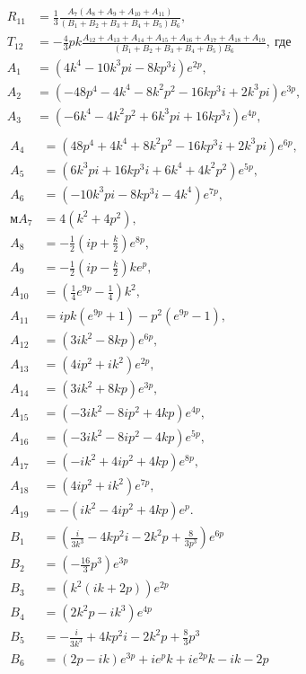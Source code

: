 \documentclass[a4 paper, 12 pt]{extarticle}
\begin{document}
   \[
   \begin{aligned}
   R_{11} &= \frac{1}{3}{\frac { A_7  \left( A_8+A_9+ A_{10}+A_{11}  \right) }{ \left( 
   		B_1+B_2+B_3+ B_4+B_5 \right) B_6 }}, \\
   T_{12} &= -\frac{4}{3}pk{\frac {A_{12} + A_{13} + A_{14} + A_{15} + A_{16} + A_{17} + A_{18} + A_{19}}{ \left(B_1+B_2+B_3+ B_4+B_5 \right) B_6 }}, \ \text{где}\\
   A_1 &= \left(4k^4 -10k^3pi - 8kp^3i\right)e^{2p}, \\
   A_2 &= \left(-48p^4 -4k^4 -8k^2p^2-16kp^3i+2k^3pi\right)e^{3p}, \\
   A_3 &= \left(-6k^4-4k^2p^2+6k^3pi+16kp^3i\right)e^{4p},\\
   \end{aligned}\]
   \[\begin{aligned}
   A_4 &= \left(48p^4+4k^4+8k^2p^2-16kp^3i+2k^3pi\right)e^{6p},\\
   A_5 &= \left(6k^3pi+16kp^3i+6k^4+4k^2p^2\right)e^{5p},\\
   A_6 &= \left(-10k^3pi-8kp^3i-4k^4\right)e^{7p},\\м
   A_7 &= 4\left(k^2+4p^2\right),\\
   A_8 &= -\frac{1}{2}\left(ip+\frac{k}{2}\right)e^{8p},\\
   A_9 &= -\frac{1}{2}\left(ip-\frac{k}{2}\right)ke^p,\\
   A_{10} &= \left(\frac{1}{4}e^{9p}-\frac{1}{4}\right)k^2,\\
   A_{11} &= ipk\left(e^{9p}+1\right)-p^2\left(e^{9p}-1\right),\\
   A_{12} &= \left(3ik^2-8kp\right)e^{6p},\\
   A_{13} &= \left(4ip^2+ik^2\right)e^{2p},\\
   A_{14} &= \left(3ik^2+8kp\right)e^{3p},\\
   A_{15} &= \left(-3ik^2-8ip^2+4kp\right)e^{4p},\\
   A_{16} &= \left(-3ik^2-8ip^2-4kp\right)e^{5p},\\
   A_{17} &= \left(-ik^2+4ip^2+4kp\right)e^{8p},\\
   A_{18} &= \left(4ip^2+ik^2\right)e^{7p},\\
   A_{19} &= -\left(ik^2-4ip^2+4kp\right)e^p.\\
   B_1 &=\left(\frac{i}{3k^3}-4kp^2i-2k^2p+\frac{8}{3p^3}\right)e^{6p}\\
   B_2 &=\left(-\frac{16}{3}p^3\right)e^{3p}\\
   B_3 &=\left(k^2\left(ik+2p\right)\right)e^{2p}\\
   B_4 &=\left(2k^2p-ik^3\right)e^{4p}\\
   B_5 &=-\frac{i}{3k^3}+4kp^2i-2k^2p+\frac{8}{3}p^3\\
   B_6 &=\left(2p-ik\right)e^{3p}+ie^pk+ie^{2p}k-ik-2p\\
   \end{aligned}\]
   
\end{document}
